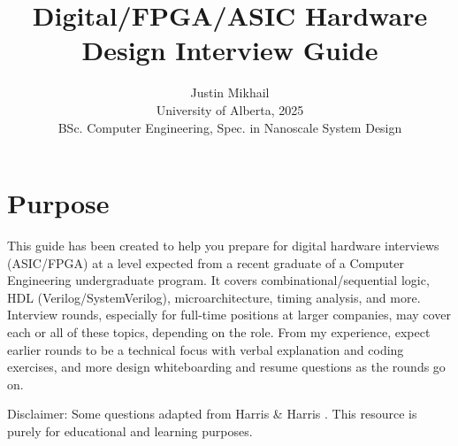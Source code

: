 \documentclass[11pt]{article}
\begin{document}
\title{Digital/FPGA/ASIC Hardware Design Interview Guide}
\author{Justin Mikhail\\University of Alberta, 2025\\BSc. Computer Engineering, Spec. in Nanoscale System Design}
\date{}
\maketitle

\section*{Purpose}
This guide has been created to help you prepare for digital hardware interviews
(ASIC/FPGA) at a level expected from a recent graduate of a Computer
Engineering undergraduate program. It covers combinational/sequential logic,
HDL (Verilog/SystemVerilog), microarchitecture, timing analysis, and more.
Interview rounds, especially for full-time positions at larger companies, may
cover each or all of these topics, depending on the role. From my experience,
expect earlier rounds to be a technical focus with verbal explanation and
coding exercises, and more design whiteboarding and resume questions as the rounds go
on.

Disclaimer: Some questions adapted from Harris \& Harris \cite{Harris2021}.
This resource is purely for educational and learning purposes. 

\end{document}

